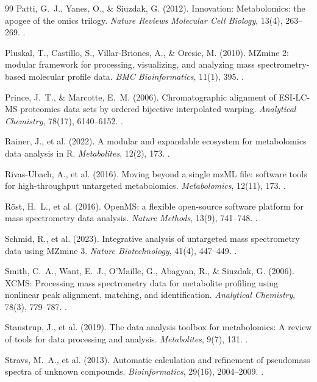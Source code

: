 \documentclass[11pt,twoside,openright]{book}
\begin{document}
\begin{thebibliography}{99}
Patti, G.~J., Yanes, O., \& Siuzdak, G. (2012). Innovation: Metabolomics: the apogee of the omics trilogy. \textit{Nature Reviews Molecular Cell Biology}, 13(4), 263--269. .

Pluskal, T., Castillo, S., Villar-Briones, A., \& Oresic, M. (2010). MZmine 2: modular framework for processing, visualizing, and analyzing mass spectrometry-based molecular profile data. \textit{BMC Bioinformatics}, 11(1), 395. .

Prince, J.~T., \& Marcotte, E.~M. (2006). Chromatographic alignment of ESI-LC-MS proteomics data sets by ordered bijective interpolated warping. \textit{Analytical Chemistry}, 78(17), 6140--6152. .

Rainer, J., et al. (2022). A modular and expandable ecosystem for metabolomics data analysis in R. \textit{Metabolites}, 12(2), 173. .

Rivas-Ubach, A., et al. (2016). Moving beyond a single mzML file: software tools for high-throughput untargeted metabolomics. \textit{Metabolomics}, 12(11), 173. .

R\"ost, H.~L., et al. (2016). OpenMS: a flexible open-source software platform for mass spectrometry data analysis. \textit{Nature Methods}, 13(9), 741--748. .

Schmid, R., et al. (2023). Integrative analysis of untargeted mass spectrometry data using MZmine 3. \textit{Nature Biotechnology}, 41(4), 447--449. .

Smith, C.~A., Want, E.~J., O'Maille, G., Abagyan, R., \& Siuzdak, G. (2006). XCMS: Processing mass spectrometry data for metabolite profiling using nonlinear peak alignment, matching, and identification. \textit{Analytical Chemistry}, 78(3), 779--787. .

Stanstrup, J., et al. (2019). The data analysis toolbox for metabolomics: A review of tools for data processing and analysis. \textit{Metabolites}, 9(7), 131. .

Stravs, M.~A., et al. (2013). Automatic calculation and refinement of pseudomass spectra of unknown compounds. \textit{Bioinformatics}, 29(16), 2004--2009. .


\end{thebibliography}
\end{document}
